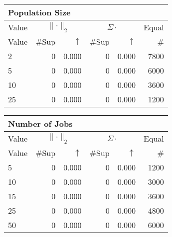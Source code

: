 \begin{center}
\renewcommand{\tabcolsep}{4pt}
\renewcommand{\arraystretch}{1.1}
\begin{customnormal}
\begin{tabular}{lrrrrr}
\multicolumn{6}{l}{Population Size}\\
\toprule
\multicolumn{1}{c}{Value} & \multicolumn{2}{c}{$\lVert \cdot \rVert_2$} & \multicolumn{2}{c}{$\Sigma \cdot$} & \multicolumn{1}{c}{Equal} \\ 
\cmidrule(lr){1-1} \cmidrule(lr){2-3} \cmidrule(lr){4-5}  \cmidrule(lr){6-6}
Value & \#Sup & $\uparrow$ & \#Sup & $\uparrow$ & \# \\ 
\midrule
2 & 0 & 0.000 & 0 & 0.000 & 7800 \\ 
5 & 0 & 0.000 & 0 & 0.000 & 6000 \\ 
10 & 0 & 0.000 & 0 & 0.000 & 3600 \\ 
25 & 0 & 0.000 & 0 & 0.000 & 1200 \\ 
\bottomrule
\end{tabular}


\end{customnormal}
\end{center}
\begin{center}
\renewcommand{\tabcolsep}{4pt}
\renewcommand{\arraystretch}{1.1}
\begin{customnormal}
\begin{tabular}{lrrrrr}
\multicolumn{6}{l}{Number of Jobs}\\
\toprule
\multicolumn{1}{c}{Value} & \multicolumn{2}{c}{$\lVert \cdot \rVert_2$} & \multicolumn{2}{c}{$\Sigma \cdot$} & \multicolumn{1}{c}{Equal} \\ 
\cmidrule(lr){1-1} \cmidrule(lr){2-3} \cmidrule(lr){4-5}  \cmidrule(lr){6-6}
Value & \#Sup & $\uparrow$ & \#Sup & $\uparrow$ & \# \\ 
\midrule
5 & 0 & 0.000 & 0 & 0.000 & 1200 \\ 
10 & 0 & 0.000 & 0 & 0.000 & 3000 \\ 
15 & 0 & 0.000 & 0 & 0.000 & 3600 \\ 
25 & 0 & 0.000 & 0 & 0.000 & 4800 \\ 
50 & 0 & 0.000 & 0 & 0.000 & 6000 \\ 
\bottomrule
\end{tabular}


\end{customnormal}
\end{center}
